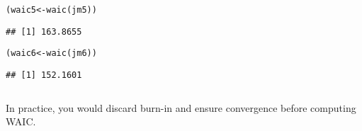 \documentclass[color=usenames,dvipsnames]{beamer}\usepackage[]{graphicx}\usepackage[]{color}
\makeatletter
\newcommand{\hlstd}[1]{\textcolor[rgb]{0,0,0}{#1}}%
\newcommand{\hlkwb}[1]{\textcolor[rgb]{0,0.341,0.682}{#1}}%
\newcommand{\hlkwd}[1]{\textcolor[rgb]{0.004,0.004,0.506}{#1}}%
\newenvironment{kframe}{%
 \def\at@end@of@kframe{}%
 \ifinner\ifhmode%
  \def\at@end@of@kframe{\end{minipage}}%
  \begin{minipage}{\columnwidth}%
 \fi\fi%
 \def\FrameCommand##1{\hskip\@totalleftmargin \hskip-\fboxsep
 \colorbox{shadecolor}{##1}\hskip-\fboxsep
     \hskip-\linewidth \hskip-\@totalleftmargin \hskip\columnwidth}%
 \MakeFramed {\advance\hsize-\width
   \@totalleftmargin\z@ \linewidth\hsize
   \@setminipage}}%
 {\par\unskip\endMakeFramed%
 \at@end@of@kframe}
\newenvironment{knitrout}{}{} %
\makeatother
\begin{document}
\begin{frame}[fragile]
\begin{columns}
\begin{column}{0.5\textwidth}
\begin{knitrout}
\end{knitrout}
\begin{knitrout}\scriptsize
{}\color{fgcolor}\begin{kframe}
\begin{alltt}
\hlstd{(waic5} \hlkwb{<-} \hlkwd{waic}\hlstd{(jm5))}
\end{alltt}
\begin{verbatim}
## [1] 163.8655
\end{verbatim}
\end{kframe}
\end{knitrout}
\begin{knitrout}\scriptsize
{}\color{fgcolor}\begin{kframe}
\begin{alltt}
\hlstd{(waic6} \hlkwb{<-} \hlkwd{waic}\hlstd{(jm6))}
\end{alltt}
\begin{verbatim}
## [1] 152.1601
\end{verbatim}
\end{kframe}
\end{knitrout}
    \end{column}
  \end{columns}
  \pause
  \vfill
  In practice, you would discard burn-in and ensure convergence before
  computing WAIC.
\end{frame}
\end{document}
